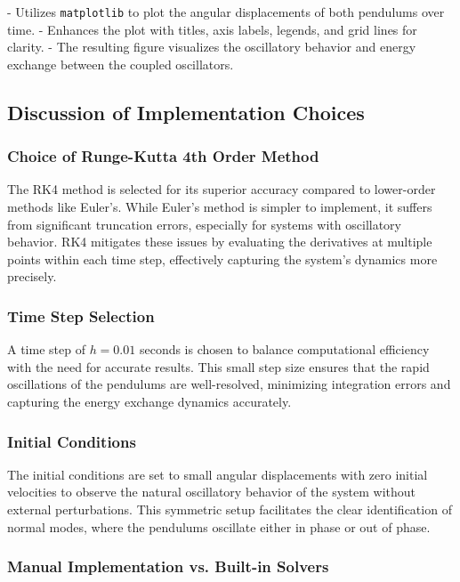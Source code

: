 \documentclass[12pt]{report} %
\begin{document}
    - Utilizes \texttt{matplotlib} to plot the angular displacements of both pendulums over time.
    - Enhances the plot with titles, axis labels, legends, and grid lines for clarity.
    - The resulting figure visualizes the oscillatory behavior and energy exchange between the coupled oscillators.
    
    \subsection{Discussion of Implementation Choices}
    \label{subsec:part1_task2_discussion}
    
    \subsubsection{Choice of Runge-Kutta 4th Order Method}
    
    The RK4 method is selected for its superior accuracy compared to lower-order methods like Euler's. While Euler's method is simpler to implement, it suffers from significant truncation errors, especially for systems with oscillatory behavior. RK4 mitigates these issues by evaluating the derivatives at multiple points within each time step, effectively capturing the system's dynamics more precisely.
    
    \subsubsection{Time Step Selection}
    
    A time step of \( h = 0.01 \) seconds is chosen to balance computational efficiency with the need for accurate results. This small step size ensures that the rapid oscillations of the pendulums are well-resolved, minimizing integration errors and capturing the energy exchange dynamics accurately.
    
    \subsubsection{Initial Conditions}
    
    The initial conditions are set to small angular displacements with zero initial velocities to observe the natural oscillatory behavior of the system without external perturbations. This symmetric setup facilitates the clear identification of normal modes, where the pendulums oscillate either in phase or out of phase.
    
    \subsubsection{Manual Implementation vs. Built-in Solvers}
    
\end{document}

